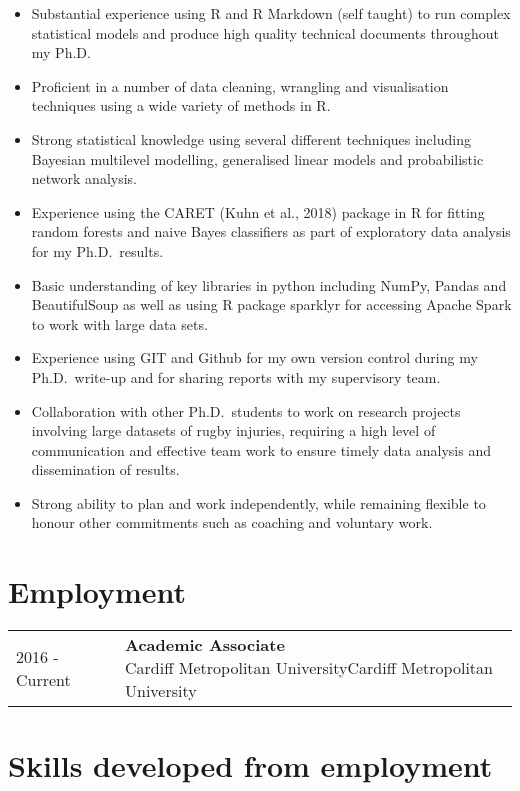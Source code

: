 \documentclass[10pt,a4paper,]{article}
\makeatletter
\providecommand{\tightlist}{%
  \setlength{\itemsep}{0pt}\setlength{\parskip}{0pt}}
\def\detaileditem#1#2#3#4#5{
#2 & \parbox[t]{0.85\textwidth}{%
      \textbf{#1}\hfill{\footnotesize #3}\\
      \ifx#4\empty\else#4\par\fi%
      \ifx#5\empty\else{%
        \vspace{0.1cm}\begin{minipage}{0.7\textwidth}%
        \begin{itemize}#5\end{itemize}%
        \end{minipage}}\fi%
      \vspace{\parsep}}\\}
\def\detailedsection#1{\begin{longtable}{@{\extracolsep{\fill}}ll}#1\end{longtable}}
\makeatother
\begin{document}
\begin{itemize}
\tightlist
\item
  Substantial experience using R and R Markdown (self taught) to run complex statistical models and produce high quality technical documents throughout my Ph.D.
\item
  Proficient in a number of data cleaning, wrangling and visualisation techniques using a wide variety of methods in R.
\item
  Strong statistical knowledge using several different techniques including Bayesian multilevel modelling, generalised linear models and probabilistic network analysis.
\item
  Experience using the CARET (Kuhn et al., 2018) package in R for fitting random forests and naive Bayes classifiers as part of exploratory data analysis for my Ph.D.~results.
\item
  Basic understanding of key libraries in python including NumPy, Pandas and BeautifulSoup as well as using R package sparklyr for accessing Apache Spark to work with large data sets.
\item
  Experience using GIT and Github for my own version control during my Ph.D.~write-up and for sharing reports with my supervisory team.
\item
  Collaboration with other Ph.D.~students to work on research projects involving large datasets of rugby injuries, requiring a high level of communication and effective team work to ensure timely data analysis and dissemination of results.
\item
  Strong ability to plan and work independently, while remaining flexible to honour other commitments such as coaching and voluntary work.
\end{itemize}

\hypertarget{employment}{%
\section{Employment}\label{employment}}

\detailedsection{\detaileditem{Academic Associate}{2016 - Current}{}{Cardiff Metropolitan University}{\empty}\detaileditem{Sports Science Support}{2017-2018}{}{Sport Wales (Voluntary role)}{\empty}\detaileditem{Athletics Coach}{2015 - 2016}{}{Cardiff Metropolitan University}{\empty}}

\hypertarget{skills-developed-from-employment}{%
\section{Skills developed from employment}\label{skills-developed-from-employment}}
\end{document}
